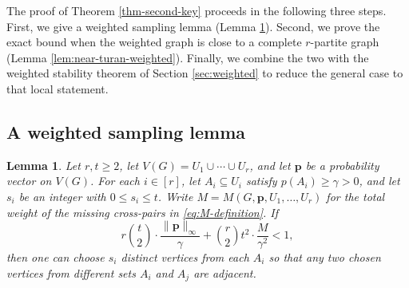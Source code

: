 \documentclass[11pt, a4paper]{article}
\newtheorem{lemma}[theorem]{Lemma}
\theoremstyle{definition}
\theoremstyle{plain}
\renewcommand{\le}{\leqslant}
\renewcommand{\ge}{\geqslant}
\newcommand{\pmax}{\lVert \bm{p} \rVert_{\infty}}
\begin{document}
\label{sec-prove-exact}

The proof of Theorem \ref{thm-second-key} proceeds in the following three steps. First, we give a weighted sampling lemma (Lemma \ref{lem:weighted-sampling}). 
Second, we prove the exact bound when the weighted graph is close to a complete $r$-partite graph (Lemma \ref{lem:near-turan-weighted}). Finally, we combine the two with the weighted stability theorem of Section \ref{sec:weighted} to reduce the general case to that local statement. 




\subsection{A weighted sampling lemma}


\begin{lemma} \label{lem:weighted-sampling}
Let $r,t\ge 2$, let $V(G)=U_1\cup\cdots\cup U_r$, and let $\bm{p}$ be a probability vector on $V(G)$. For each $i\in[r]$, let $A_i\subseteq U_i$ satisfy $p(A_i)\ge \gamma>0$, and let $s_i$ be an integer with $0\le s_i\le t$. Write $M=M(G,\bm{p},U_1,\ldots ,U_r)$ for the total
weight of the missing cross-pairs in
\eqref{eq:M-definition}. If
\begin{equation}\label{eq:sampling-condition}
  r\binom{t}{2} \cdot \frac{\pmax}{\gamma}
  +\binom{r}{2}t^2 \cdot \frac{M}{\gamma^2}<1,
\end{equation}
then one can choose $s_i$ distinct vertices from each $A_i$ so that any two chosen vertices from different sets $A_i$ and $A_j$ are adjacent.
\end{lemma}
\end{document}
